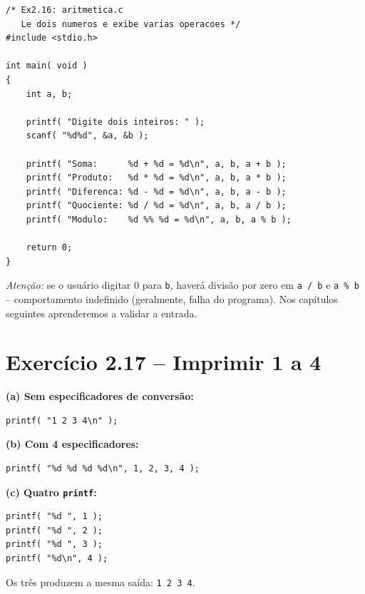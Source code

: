 \documentclass[12pt,a4paper]{article}
\begin{document}
\begin{respostabox}
\begin{lstlisting}
/* Ex2.16: aritmetica.c
   Le dois numeros e exibe varias operacoes */
#include <stdio.h>

int main( void )
{
    int a, b;

    printf( "Digite dois inteiros: " );
    scanf( "%d%d", &a, &b );

    printf( "Soma:      %d + %d = %d\n", a, b, a + b );
    printf( "Produto:   %d * %d = %d\n", a, b, a * b );
    printf( "Diferenca: %d - %d = %d\n", a, b, a - b );
    printf( "Quociente: %d / %d = %d\n", a, b, a / b );
    printf( "Modulo:    %d %% %d = %d\n", a, b, a % b );

    return 0;
}
\end{lstlisting}

\textit{Atenção:} se o usuário digitar 0 para \texttt{b}, haverá divisão por zero
em \texttt{a / b} e \texttt{a \% b} -- comportamento indefinido (geralmente, falha
do programa). Nos capítulos seguintes aprenderemos a validar a entrada.
\end{respostabox}

\newpage

\section{Exercício 2.17 -- Imprimir 1 a 4}

\begin{respostabox}
\textbf{(a) Sem especificadores de conversão:}
\begin{lstlisting}
printf( "1 2 3 4\n" );
\end{lstlisting}

\textbf{(b) Com 4 especificadores:}
\begin{lstlisting}
printf( "%d %d %d %d\n", 1, 2, 3, 4 );
\end{lstlisting}

\textbf{(c) Quatro \texttt{printf}:}
\begin{lstlisting}
printf( "%d ", 1 );
printf( "%d ", 2 );
printf( "%d ", 3 );
printf( "%d\n", 4 );
\end{lstlisting}

Os três produzem a mesma saída: \texttt{1 2 3 4}.
\end{respostabox}

\end{document}

